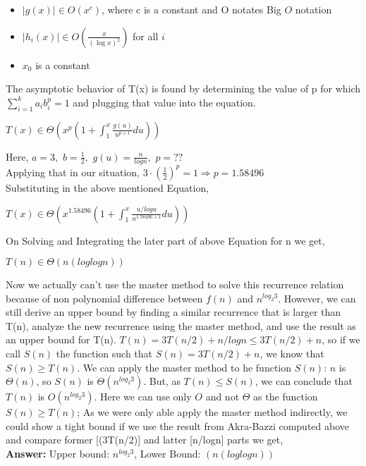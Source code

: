 \documentclass[12pt]{article}
\begin{document}
\begin{enumerate}
\begin{enumerate}
\begin{enumerate}
\begin{itemize}
	\item {$\left|g(x)\right| \in O(x^{c})$, where c is a constant and O notates Big $O$ notation}
	\item {$\left| h_{i}(x) \right| \in  \displaystyle{O\left(\frac{x}{(\log x)^{2}}\right)}$ for all $i$}
	\item {$x_{0}$ is a constant}
\end{itemize}
The asymptotic behavior of T(x) is found by determining the value of p for which $ \displaystyle{\sum_{i=1}^{k} a_{i} b_{i}^{p} = 1}$ and plugging that value into the equation.
\begin{center}
	$ \displaystyle{T(x) \in \Theta \left( x^p\left( 1+\int_1^x \frac{g(u)}{u^{p+1}}du \right)\right)}$
\end{center}
Here, $a = 3,$ $b = \displaystyle{\frac{1}{2}},$ $g(u) = \displaystyle{\frac{n}{log n}},$ $p = ??$\\
Applying that in our situation, $ \displaystyle{3\cdot\left(\frac{1}{2}\right)^{p} = 1} \Rightarrow p = 1.58496$\\
Substituting in the above mentioned Equation, \\
\begin{center}
	$ \displaystyle{T(x) \in \Theta \left( x^{1.58496}\left( 1+\int_1^x \frac{u/log u}{u^{1.58496+1}}du \right)\right)}$
\end{center}
On Solving and Integrating the later part of above Equation for n we get,
\begin{center}
	$ \displaystyle{T(n) \in \Theta \left(n(log log n)\right)}$
\end{center}
Now we actually can't use the master method to solve this recurrence relation\cite{rr} because of non polynomial difference between $f(n)$ and $n^{log_{2}3}$. However, we can still derive an upper bound by finding a similar recurrence that is larger than T(n), analyze the new recurrence using the master method, and use the result as an upper bound for T(n).
$ T(n) = 3T(n/2) + n/logn \le 3T(n/2) + n$, so if we call $S(n)$ the function such that $S(n)=3T(n/2)+ n$, we know that $S(n)\ge T(n)$. We can apply the master method to he function $S(n)$: $n$ is $\Theta(n)$, so $S(n)$ is $\Theta(n^{log_{2}3})$. But, as $T(n)\le S(n)$, we can conclude that $T(n)$ is $O(n^{log_{2}3})$. Here we can use only $O$ and not $\Theta$ as the function $S(n) \ge T(n)$; As we were only able apply the master method indirectly, we could show a tight bound if we use the result from Akra-Bazzi computed above and compare former [(3T(n/2)] and latter [n/logn] parts we get, \\
\textbf{Answer:} Upper bound: $n^{log_{2}3}$, Lower Bound: $\left(n(log log n)\right)$


\end{enumerate}
\end{enumerate}
\end{enumerate}
\end{document}
